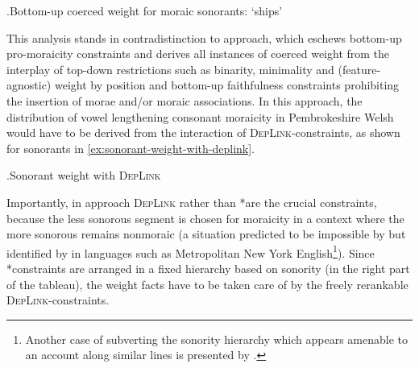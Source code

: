\ex.Bottom\hyp up coerced weight for moraic sonorants: \ipa{[ˈɬoŋe]} `ships'\\
\begin{OTmultitableau}{3}
\OTmcandrow[][\OThand]{[ɬo\smo[ŋ\smo]e]}{,*,}
\OTmcandrow[][\OThand]{[ɬo\smo[ŋ\smo]e]}{,*,*}
\end{OTmultitableau}


This analysis stands in contradistinction to  approach, which eschews bottom\hyp up pro\hyp moraicity constraints and derives all instances of coerced weight from the interplay of top\hyp down restrictions such as binarity, minimality and (feature\hyp agnostic) weight by position and bottom\hyp up faithfulness constraints prohibiting the insertion of morae and\fshyp or moraic associations. In this approach, the distribution of vowel lengthening \vs consonant moraicity in Pembrokeshire Welsh would have to be derived from the interaction of \textsc{Dep\-Link}-\mo constraints, as shown for sonorants in \cref{ex:sonorant-weight-with-deplink}.

\ex.\label{ex:sonorant-weight-with-deplink}Sonorant weight with \textsc{DepLink}\\

Importantly, in  approach \textsc{DepLink} rather than *\mo are the crucial constraints, because the less sonorous segment \ipa{[ŋ]} is chosen for moraicity in a context where the more sonorous \ipa{[l]} remains nonmoraic (a situation predicted to be impossible by \citealp{zec88:_sonor} but identified by \citealp{moren01:_distin} in languages such as Metropolitan New York English\footnote{Another case of subverting the sonority hierarchy which appears amenable to an account along similar lines is presented by \citet{hermans05:_again}.}). Since *\mo constraints are arranged in a fixed hierarchy based on sonority (in the right part of the tableau), the weight facts have to be taken care of by the freely rerankable \textsc{DepLink}-\mo constraints.

